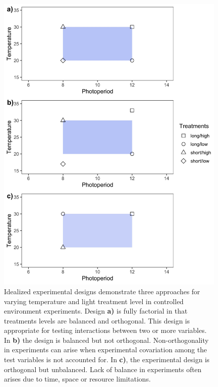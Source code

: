 \documentclass[11pt]{article}
\begin{document}
\begin{figure}[h!]
    \centering
 \includegraphics[width=.8\textwidth]{..//Plots/periodicity_figures/factorial.jpeg}
    \caption{Idealized experimental designs demonstrate three approaches for varying temperature and light treatment level in controlled environment experiments. Design \textbf{a)} is fully factorial in that treatments levels are balanced and orthogonal. This design is appropriate for testing interactions between two or more variables. In \textbf{b)} the design is balanced but not orthogonal. Non-orthogonality in experiments can arise when experimental covariation among the test variables is not accounted for. In \textbf{c)}, the experimental design is orthogonal but unbalanced. Lack of balance in experiments often arises due to time, space or resource limitations. }
    \label{fig:examp}
\end{figure}
\end{document}
